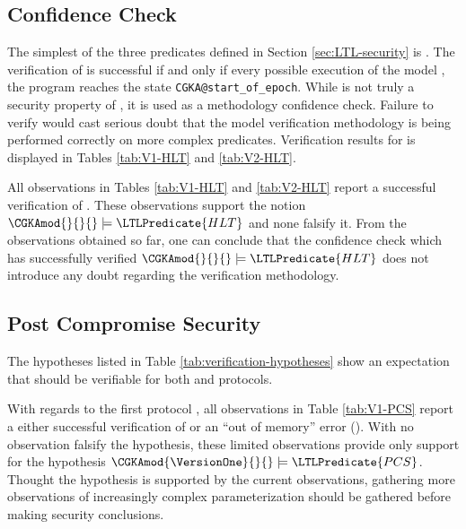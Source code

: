 \hypertarget{sec:post-compromise-security}{%
\subsection{Confidence Check}\label{sec:post-compromise-security}}

The simplest of the three  predicates defined in Section \ref{sec:LTL-security} is .
The verification of  is successful if and only if every possible execution of the model \CGKAmod{}{}{}, the program reaches the state \texttt{CGKA@start\_of\_epoch}.
While  is not truly a security property of \CGKAmod{}{}{}, it is used as a methodology confidence check.
Failure to verify  would cast serious doubt that the model verification methodology is being performed correctly on more complex  predicates.
Verification results for  is displayed in Tables \ref{tab:V1-HLT} and \ref{tab:V2-HLT}.

All observations in Tables \ref{tab:V1-HLT} and \ref{tab:V2-HLT} report a successful verification of .
These observations support the notion \( \CGKAmod{}{}{} \models \LTLPredicate{HLT} \) and none falsify it.
From the observations obtained so far, one can conclude that the confidence check which has successfully verified \( \CGKAmod{}{}{} \models \LTLPredicate{HLT} \) does not introduce any doubt regarding the verification methodology.


\hypertarget{sec:post-compromise-security}{%
\subsection{Post Compromise Security}\label{sec:post-compromise-security}}

The hypotheses listed in Table \ref{tab:verification-hypotheses} show an expectation that  should be verifiable for both \VersionOne and \VersionTwo protocols.

With regards to the first protocol \VersionOne, all observations in Table \ref{tab:V1-PCS} report a either successful verification of  or an ``out of memory'' error (\OutOfMemory).
With no observation falsify the hypothesis, these limited observations provide only support for the hypothesis \( \CGKAmod{\VersionOne}{}{} \models \LTLPredicate{PCS} \).
Thought the hypothesis is supported by the current observations, gathering more observations of increasingly complex \CGKAmod{\VersionOne}{}{} parameterization should be gathered before making security conclusions.

